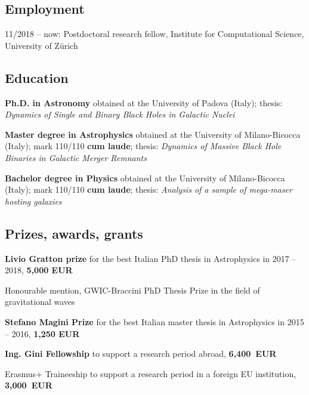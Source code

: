 

\subsection*{Employment}

11/2018 – now: Postdoctoral research fellow, Institute for Computational Science,  University of Z\"urich 

\subsection*{Education}
\begin{description}
\setlength\itemsep{-1.5pt}
\item[\normalfont 05/03/2019:]  \textbf{Ph.D. in Astronomy} obtained at the University of Padova (Italy);
thesis: \textit{Dynamics of Single and Binary Black Holes in Galactic Nuclei}


\item[\normalfont 21/09/2015:] \textbf{Master degree in Astrophysics} obtained  at the University of Milano-Bicocca (Italy); mark 110/110 \textbf{cum laude}; thesis: \textit{Dynamics of Massive Black Hole Binaries in Galactic Merger Remnants}


\item[\normalfont 21/10/2013:]  \textbf{Bachelor degree in Physics} obtained at the University of Milano-Bicocca (Italy); mark 110/110 \textbf{cum laude}; 
thesis: \textit{Analysis of a sample of mega-maser hosting galaxies}
\end{description}

\subsection*{{Prizes, awards, grants}}

\begin{description}
\setlength\itemsep{-2pt}

\item[\normalfont 2019:] \textbf{Livio Gratton prize} for the best Italian PhD thesis in Astrophysics in 2017 -- 2018, \textbf{5,000 EUR}

\item[\normalfont 2019:] {Honourable mention, GWIC-Braccini PhD Thesis Prize} in the field of gravitational waves

\item[\normalfont 2017:] \textbf{Stefano Magini Prize} for the best Italian master thesis in Astrophysics in 2015 -- 2016, \textbf{1,250 EUR}

\item[\normalfont 2016:] \textbf{Ing. Gini Fellowship} to support a research period abroad,  {\bf 6,400~EUR}

\item [\normalfont 2015:] {Erasmus+ Traineeship} to support a research period  in a foreign EU institution,  {\bf 3,000~EUR}

\end{description}

